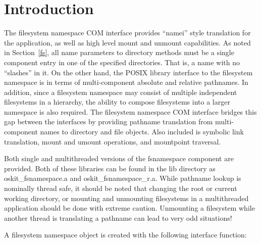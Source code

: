 %
% 
%

\label{fsnamespace}

\section{Introduction}

The \oskit{} filesystem namespace COM interface provides ``namei'' style
translation for the application, as well as high level mount and unmount
capabilities. As noted in Section~\ref{fs}, all name parameters to
\oskit{} directory methods must be a single component entry in one of the
specified directories. That is, a name with no ``slashes'' in it. On the
other hand, the POSIX library interface to the filesystem namespace is in
terms of multi-component absolute and relative pathnames. In addition,
since a filesystem namespace may consist of multiple independent
filesystems in a hierarchy, the ability to compose filesystems into a larger
namespace is also required. The \oskit{} filesystem namespace COM interface
bridges this gap between the interfaces by providing pathname translation
from multi-component names to \oskit{} directory and file objects. Also
included is symbolic link translation, mount and umount operations, and
mountpoint traversal.

Both single and multithreaded versions of the fsnamespace component are
provided. Both of these libraries can be found in the lib directory as
oskit_fsnamespace.a and oskit_fsnamespace_r.a. While pathname lookup is
nominally thread safe, it should be noted that changing the root or current
working directory, or mounting and unmounting filesystems in a multithreaded
application should be done with extreme caution. Unmounting a
filesystem while another thread is translating a pathname can lead to very
odd situations!

A filesystem namespace object is created with the following interface
function:

